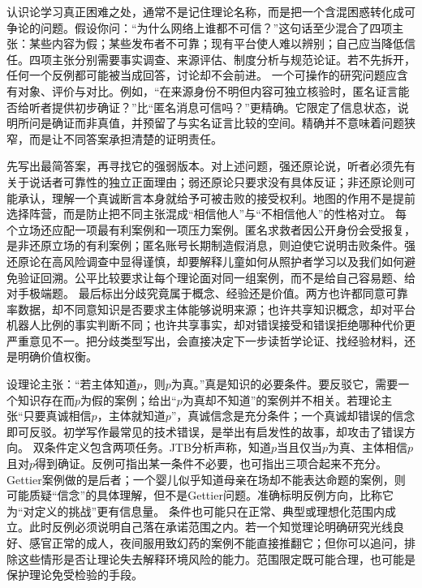  认识论学习真正困难之处，通常不是记住理论名称，而是把一个含混困惑转化成可争论的问题。假设你问：“为什么网络上谁都不可信？”这句话至少混合了四项主张：某些内容为假；某些发布者不可靠；现有平台使人难以辨别；自己应当降低信任。四项主张分别需要事实调查、来源评估、制度分析与规范论证。若不先拆开，任何一个反例都可能被当成回答，讨论却不会前进。 一个可操作的研究问题应含有对象、评价与对比。例如，“在来源身份不明但内容可独立核验时，匿名证言能否给听者提供初步确证？”比“匿名消息可信吗？”更精确。它限定了信息状态，说明所问是确证而非真值，并预留了与实名证言比较的空间。精确并不意味着问题狭窄，而是让不同答案承担清楚的证明责任。

先写出最简答案，再寻找它的强弱版本。对上述问题，强还原论说，听者必须先有关于说话者可靠性的独立正面理由；弱还原论只要求没有具体反证；非还原论则可能承认，理解一个真诚断言本身就给予可被击败的接受权利。地图的作用不是提前选择阵营，而是防止把不同主张混成“相信他人”与“不相信他人”的性格对立。 每个立场还应配一项最有利案例和一项压力案例。匿名求救者因公开身份会受报复，是非还原立场的有利案例；匿名账号长期制造假消息，则迫使它说明击败条件。强还原论在高风险调查中显得谨慎，却要解释儿童如何从照护者学习以及我们如何避免验证回溯。公平比较要求让每个理论面对同一组案例，而不是给自己容易题、给对手极端题。 最后标出分歧究竟属于概念、经验还是价值。两方也许都同意可靠率数据，却不同意知识是否要求主体能够说明来源；也许共享知识概念，却对平台机器人比例的事实判断不同；也许共享事实，却对错误接受和错误拒绝哪种代价更严重意见不一。把分歧类型写出，会直接决定下一步读哲学论证、找经验材料，还是明确价值权衡。

设理论主张：“若主体知道$p$，则$p$为真。”真是知识的必要条件。要反驳它，需要一个知识存在而$p$为假的案例；给出“$p$为真却不知道”的案例并不相关。若理论主张“只要真诚相信$p$，主体就知道$p$”，真诚信念是充分条件；一个真诚却错误的信念即可反驳。初学写作最常见的技术错误，是举出有启发性的故事，却攻击了错误方向。 双条件定义包含两项任务。JTB分析声称，知道$p$当且仅当$p$为真、主体相信$p$且对$p$得到确证。反例可指出某一条件不必要，也可指出三项合起来不充分。Gettier案例做的是后者；一个婴儿似乎知道母亲在场却不能表达命题的案例，则可能质疑“信念”的具体理解，但不是Gettier问题。准确标明反例方向，比称它为“对定义的挑战”更有信息量。 条件也可能只在正常、典型或理想化范围内成立。此时反例必须说明自己落在承诺范围之内。若一个知觉理论明确研究光线良好、感官正常的成人，夜间服用致幻药的案例不能直接推翻它；但你可以追问，排除这些情形是否让理论失去解释环境风险的能力。范围限定既可能合理，也可能是保护理论免受检验的手段。

